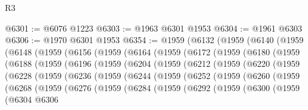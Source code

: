 \begin{lexlean}{R3}
\begin{coremodule}
@6301 := @6076 @1223
@6303 := @1963 @6301 @1953
@6304 := @1961 @6303
@6306 := @1970 @6301 @1953
@6354 := @1959
    (@6132
      (@1959
        (@6140
          (@1959
            (@6148
              (@1959
                (@6156
                  (@1959
                    (@6164
                      (@1959
                        (@6172
                          (@1959
                            (@6180
                              (@1959
                                (@6188
                                  (@1959
                                    (@6196
                                      (@1959
                                        (@6204
                                          (@1959
                                            (@6212
                                              (@1959
                                                (@6220
                                                  (@1959
                                                    (@6228
                                                      (@1959
                                                        (@6236
                                                          (@1959
                                                            (@6244
                                                              (@1959
                                                                (@6252
                                                                  (@1959
                                                                    (@6260
                                                                      (@1959
                                                                        (@6268
                                                                          (@1959
                                                                            (@6276
                                                                              (@1959
                                                                                (@6284
                                                                                  (@1959
                                                                                    (@6292
                                                                                      (@1959
                                                                                        (@6300
                                                                                          (@1959
                                                                                            (@6304
                                                                                              @6306

\end{coremodule}
\end{lexlean}
